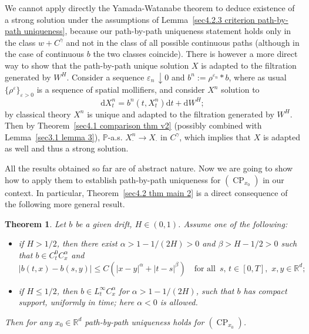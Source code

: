 \documentclass[10pt]{article}
\newcommand{\assign}{:=}
\newcommand{\mathd}{\mathrm{d}}
\newcommand{\tmop}[1]{\ensuremath{\operatorname{#1}}}
\newtheorem{theorem}{Theorem}
\begin{document}
\begin{remark}
  We cannot apply directly the Yamada-Watanabe theorem to deduce existence of
  a strong solution under the assumptions of Lemma~\ref{sec4.2.3 criterion
  path-by-path uniqueness}, because our path\mbox{-}by\mbox{-}path uniqueness
  statement holds only in the class $w + C^{\gamma}$ and not in the class of
  all possible continuous paths (although in the case of continuous $b$ the
  two classes coincide). There is however a more direct way to show that the
  path\mbox{-}by\mbox{-}path unique solution $X$ is adapted to the filtration
  generated by $W^H$. Consider a sequence $\varepsilon_n \, \downarrow 0$ and
  $b^n \assign \rho^{\varepsilon_n} \ast b$, where as usual $\{
  \rho^{\varepsilon} \}_{\varepsilon > 0}$ is a sequence of spatial
  mollifiers, and consider $X^n$ solution to
  \[ \mathd X^n_t = b^n (t, X^n_t) \mathd t + \mathd W^H ; \]
  by classical theory $X^n$ is unique and adapted to the filtration generated
  by $W^H$. Then by Theorem~\ref{sec4.1 comparison thm v2} (possibly combined
  with Lemma~\ref{sec3.1 lemma 3}), $\mathbb{P}$\mbox{-}a.s. $X^n_{\cdot}
  \rightarrow X_{\cdot}$ in $C^{\gamma}$, which implies that $X$ is adapted as
  well and thus a strong solution.
\end{remark}

All the results obtained so far are of abstract nature. Now we are going to
show how to apply them to establish path\mbox{-}by\mbox{-}path uniqueness for
$(\tmop{CP}_{x_0})$ in our context. In particular, Theorem~\ref{sec4.2 thm
main 2} is a direct consequence of the following more general result.

\begin{theorem}
  \label{sec4.2.3 thm path-by-path uniqueness}Let $b$ be a given drift, $H \in
  (0, 1)$. Assume one of the following:
  \begin{itemize}
    \item if $H > 1 / 2$, then there exist $\alpha > 1 - 1 / (2 H) > 0$ and
    $\beta > H - 1 / 2 > 0$ such that $b \in C^0_t C^{\alpha}_x$ and
    \[ | b (t, x) - b (s, y) | \leqslant C (| x - y |^{\alpha} + | t - s
       |^{\beta}) \quad \text{for all } \, s, \, t \in [0, T], \, \, x, y \in
       \mathbb{R}^d ; \]
    \item if $H \leqslant 1 / 2$, then $b \in L^{\infty}_t C^{\alpha}_x$ for
    $\alpha > 1 - 1 / (2 H)$, such that $b$ has compact support, uniformly in
    time; here $\alpha < 0$ is allowed. 
  \end{itemize}
  Then for any $x_0 \in \mathbb{R}^d$ path\mbox{-}by\mbox{-}path uniqueness
  holds for $(\tmop{CP}_{x_0})$.
\end{theorem}
\end{document}
